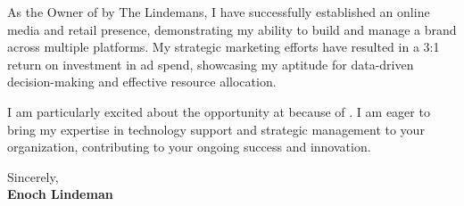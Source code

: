 As the Owner of by The Lindemans, I have successfully established an online media and retail presence, demonstrating my ability to build and manage a brand across multiple platforms. My strategic marketing efforts have resulted in a 3:1 return on investment in ad spend, showcasing my aptitude for data-driven decision-making and effective resource allocation.

I am particularly excited about the opportunity at \textbf{\CompanyName} because of \textbf{\SpecificReason}. I am eager to bring my expertise in technology support and strategic management to your organization, contributing to your ongoing success and innovation.

\vspace{0.5cm}

\noindent Sincerely, \\
\noindent \textbf{Enoch Lindeman}



